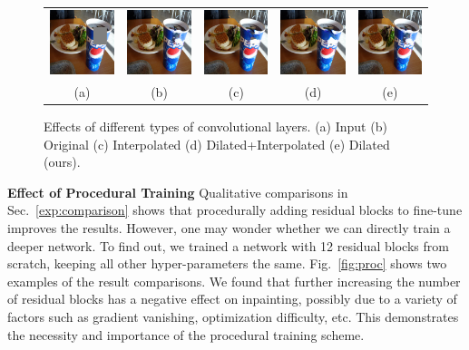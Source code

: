 \begin{figure}[h!]
\centering
\small
\begin{tabular}{ccccc}
\includegraphics[width=.2\textwidth]{figures/conv/000000311303_input_image.jpg}&
\includegraphics[width=.2\textwidth]{figures/conv/000000311303_synthesized_image.jpg}&
\includegraphics[width=.2\textwidth]{figures/conv/000000311303_synthesized_image-0.jpg}&
\includegraphics[width=.2\textwidth]{figures/conv/000000311303_synthesized_image-1.jpg}&
\includegraphics[width=.2\textwidth]{figures/conv/000000311303_synthesized_image.jpg}\\
(a) & (b) & (c) & (d) & (e)  \\
\end{tabular}
\caption{Effects of different types of convolutional layers. (a) Input (b) Original (c) Interpolated (d) Dilated+Interpolated (e) Dilated (ours).}
\label{fig:conv}
\vspace{-15pt}
\end{figure}  

\noindent\textbf{Effect of Procedural Training} Qualitative comparisons in Sec.~\ref{exp:comparison} shows that procedurally adding residual blocks to fine-tune improves the results. However, one may wonder whether we can directly train a deeper network. To find out, we trained a network with 12 residual blocks from scratch, keeping all other hyper-parameters the same. Fig.~\ref{fig:proc} shows two examples of the result comparisons. We found that further increasing the number of residual blocks has a negative effect on inpainting, possibly due to a variety of factors such as gradient vanishing, optimization difficulty, etc. This demonstrates the necessity and importance of the procedural training scheme.

